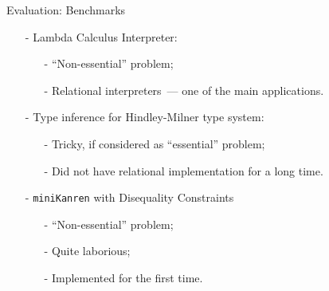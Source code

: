 \documentclass{beamer}
\newcommand{\miniKanren}{\texttt{miniKanren}\xspace}
\theoremstyle{definition}
\begin{document}
\begin{comment}
\begin{frame}\frametitle{Implementation}

\begin{itemize}
    \item Input language -- subset of OCaml
    \item Output language -- OCanren
    \item Language of implementation -- OCaml
\end{itemize}

\end{frame}
\end{comment}


\begin{frame}[fragile]{Evaluation: Benchmarks}

\begin{itemize}
    \item[-] Lambda Calculus Interpreter:
    \begin{itemize}
        \item[-] ``Non-essential'' problem;
        \item[-] Relational interpreters~--- one of the main applications.
    \end{itemize}
    \pause\vskip2mm
    \item[-] Type inference for Hindley-Milner type system:
        \begin{itemize}
        \item[-] Tricky, if considered as ``essential'' problem;
        \item[-] Did not have relational implementation for a long time.
    \end{itemize}
    \pause\vskip2mm
    \item[-] \miniKanren with Disequality Constraints
        \begin{itemize}
        \item[-] ``Non-essential'' problem;
        \item[-] Quite laborious;
        \item[-] Implemented for the first time.
    \end{itemize}
\end{itemize}

\end{frame}
\end{document}
